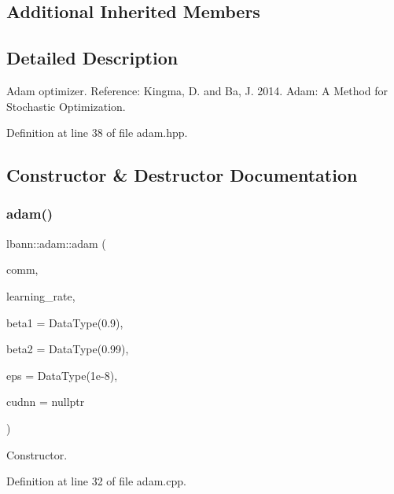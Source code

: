 \subsection*{Additional Inherited Members}


\subsection{Detailed Description}
Adam optimizer. Reference\+: Kingma, D. and Ba, J. 2014. Adam\+: A Method for Stochastic Optimization. 

Definition at line 38 of file adam.\+hpp.



\subsection{Constructor \& Destructor Documentation}
\mbox{\label{classlbann_1_1adam_a9d6848fa245bc2adfe142ae3aeb4e33d}} 
\subsubsection{\texorpdfstring{adam()}{adam()}\hspace{0.1cm}{\footnotesize\ttfamily [1/2]}}
{\footnotesize\ttfamily lbann\+::adam\+::adam (\begin{DoxyParamCaption}\item[{\hyperlink{classlbann_1_1lbann__comm}{lbann\+\_\+comm} $\ast$}]{comm,  }\item[{Data\+Type}]{learning\+\_\+rate,  }\item[{Data\+Type}]{beta1 = {\ttfamily DataType(0.9)},  }\item[{Data\+Type}]{beta2 = {\ttfamily DataType(0.99)},  }\item[{Data\+Type}]{eps = {\ttfamily DataType(1e-\/8)},  }\item[{\hyperlink{classlbann_1_1cudnn_1_1cudnn__manager}{cudnn\+::cudnn\+\_\+manager} $\ast$}]{cudnn = {\ttfamily nullptr} }\end{DoxyParamCaption})}

Constructor. 

Definition at line 32 of file adam.\+cpp.


